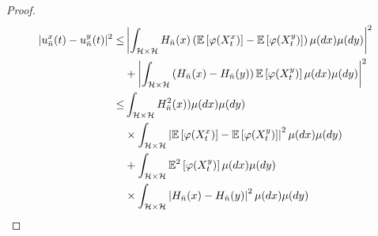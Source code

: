 \documentclass[review,onefignum,onetabnum]{siamart190516}
\begin{document}
\begin{proof}
\begin{equation}
\begin{aligned}
                |u_{\bar n} ^ x(t) - u_{\bar n} ^ y(t)| ^ 2
                    \le&
                    \left|
                        \int_{\mathcal{H} 
                        \times
                        \mathcal{H}} H_{\bar n}(x)
                        \left(
                            \E
                             \left[
                                \varphi(X_t^x)
                             \right]
                             -
                            \E\left[
                                \varphi(X_t^y)
                            \right]
                        \right) \mu(dx)\mu(dy)
                    \right|^2
                    \\
                    &+
                    \left|
                        \int_{\mathcal{H}
                        \times
                        \mathcal{H}
                        }
                        \left(
                            H_{\bar n}(x) - H_{\bar n}(y)
                        \right)
                        \E\left[
                            \varphi(X_t ^ y)
                        \right]
                        \mu(dx)\mu(dy)
                    \right|^2
                    \\
                    \le &
                    \int_{\mathcal{H}\times \mathcal{H}}
                        H_{\bar n}^2(x))
                    \mu(dx)\mu(dy)
                    \\
                    &\times
                        \int_{\mathcal{H}\times \mathcal{H}}
                        \left|
                            \E\left [
                                \varphi(X_t^x)
                            \right]
                            -
                            \E\left[
                                \varphi(X_t^y)
                            \right]
                        \right|^2
                        \mu(dx)\mu(dy)
                    \\
                    &+
                    \int_{\mathcal{H} \times \mathcal{H}}
                        \E^2
                        \left[
                            \varphi(X_t^y)
                        \right]
                    \mu(dx)\mu(dy)
                    \\
                     &\times
                    \int_{\mathcal{H}\times \mathcal{H}}
                    \left|
                        H_{\bar n}(x)-H_{\bar n}(y)
                    \right|^2
                    \mu(dx)\mu(dy)
                    \\

\end{aligned}
\end{equation}
\end{proof}
\end{document}
